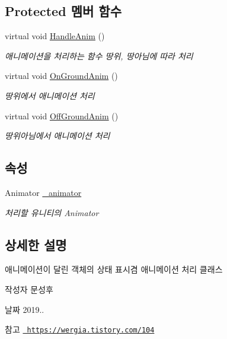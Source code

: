 \subsection*{Protected 멤버 함수}
\begin{DoxyCompactItemize}
\item 
virtual void \mbox{\hyperlink{class_state_aa064ec6cd84d4a09b2c72a536125c74b}{Handle\+Anim}} ()
\begin{DoxyCompactList}\small\item\em 애니메이션을 처리하는 함수\textquotesingle{} 땅위, 땅아님에 따라 처리 \end{DoxyCompactList}\item 
virtual void \mbox{\hyperlink{class_state_adc5e7be4e977f0a64b29b01171eda8af}{On\+Ground\+Anim}} ()
\begin{DoxyCompactList}\small\item\em 땅위에서 애니메이션 처리 \end{DoxyCompactList}\item 
virtual void \mbox{\hyperlink{class_state_a2909a234430fa7752fadf2bb993ab5e2}{Off\+Ground\+Anim}} ()
\begin{DoxyCompactList}\small\item\em 땅위아님에서 애니메이션 처리 \end{DoxyCompactList}\end{DoxyCompactItemize}
\subsection*{속성}
\begin{DoxyCompactItemize}
\item 
Animator \mbox{\hyperlink{class_state_aff1dd03a1b3c63053b23371d6d70cd1a}{\+\_\+animator}}
\begin{DoxyCompactList}\small\item\em 처리할 유니티의 Animator \end{DoxyCompactList}\end{DoxyCompactItemize}


\subsection{상세한 설명}
애니메이션이 달린 객체의 상태 표시겸 애니메이션 처리 클래스 

\begin{DoxyAuthor}{작성자}
문성후 
\end{DoxyAuthor}
\begin{DoxyDate}{날짜}
2019.. 
\end{DoxyDate}
\begin{DoxySeeAlso}{참고}
\href{https://wergia.tistory.com/104}{\texttt{ https\+://wergia.\+tistory.\+com/104}} 
\end{DoxySeeAlso}


